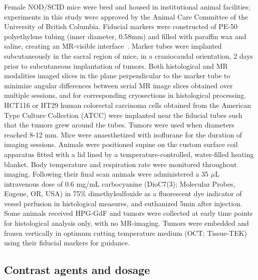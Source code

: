 Female NOD/SCID mice were bred and housed in institutional animal facilities; experiments in this study were approved by the Animal Care Committee of the University of British Columbia.
Fiducial markers were constructed of PE-50 polyethylene tubing (inner diameter, 0.58mm) and filled with paraffin wax and saline, creating an MR-visible interface~\cite{Bains:2009hh}.
Marker tubes were implanted subcutaneously in the sacral region of mice, in a craniocaudal orientation, 2 days prior to subcutaneous implantation of tumors.
Both histological and MR modalities imaged slices in the plane perpendicular to the marker tube to minimize angular differences between serial MR image slices obtained over multiple sessions, and for corresponding cryosections in histological processing.
HCT116 or HT29 human colorectal carcinoma cells obtained from the American Type Culture Collection (ATCC) were implanted near the fiducial tubes such that the tumors grew around the tubes.
Tumors were used when diameters reached 8-12 mm.
Mice were anaesthetized with isoflurane for the duration of imaging sessions.
Animals were positioned supine on the custom surface coil apparatus fitted with a lid lined by a temperature-controlled, water-filled heating blanket.
Body temperature and respiration rate were monitored throughout imaging.
Following their final scan animals were administered a 35 $\mu$L intravenous dose of 0.6 mg/mL carbocyanine (DioC7(3); Molecular Probes, Eugene, OR, USA) in 75\% dimethylsulfoxide as a fluorescent dye indicator of vessel perfusion in histological measures, and euthanized 5min after injection.
Some animals received HPG-GdF and tumors were collected at early time points for histological analysis only, with no MR-imaging.
Tumors were embedded and frozen vertically in optimum cutting temperature medium (OCT; Tissue-TEK) using their fiducial markers for guidance.

\subsection{Contrast agents and dosage}

